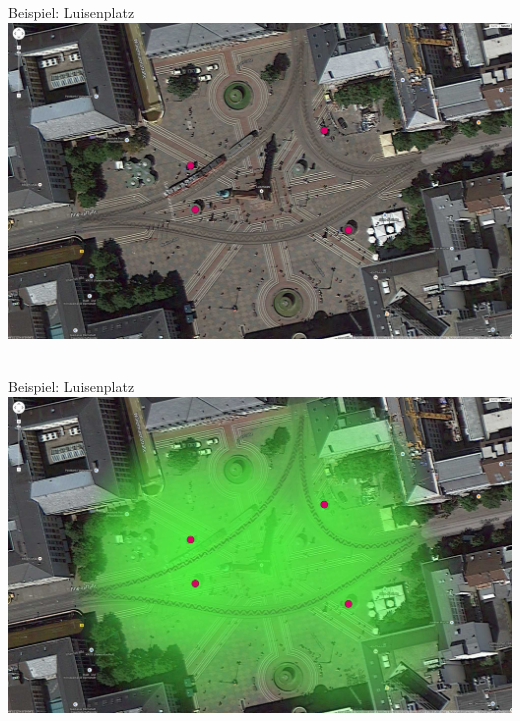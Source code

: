 \documentclass{beamer}
\begin{document}
\begin{frame}{Beispiel: Luisenplatz}
\includegraphics[height=0.75\textheight]{images/plan_luisenplatz2.jpg}$\;$
\end{frame}

\begin{frame}{Beispiel: Luisenplatz}
\includegraphics[height=0.75\textheight]{images/plan_luisenplatz3.jpg}$\;$
\end{frame}
\end{document}
